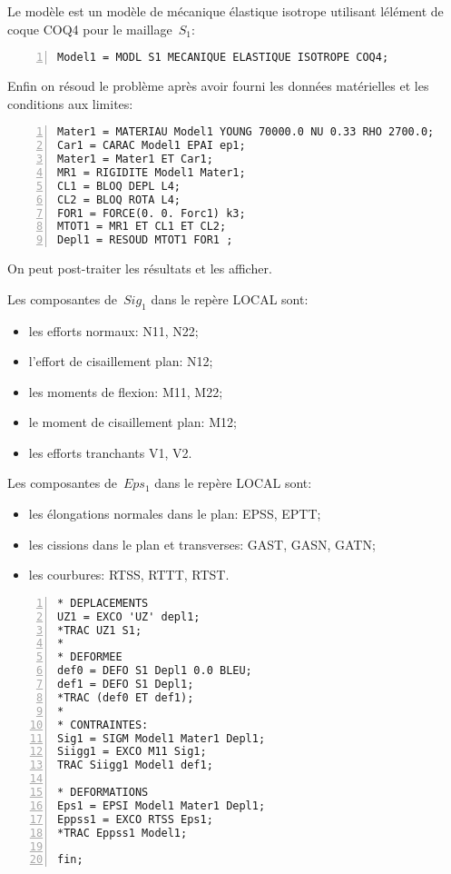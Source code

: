 \medskip
Le modèle est un modèle de mécanique élastique isotrope utilisant lélément de coque COQ4 pour le maillage~$S_1$:

\begin{Verbatim}[numbers=left,numbersep=3pt,firstnumber=last]
Model1 = MODL S1 MECANIQUE ELASTIQUE ISOTROPE COQ4;
\end{Verbatim}

\medskip
Enfin on résoud le problème après avoir fourni les données matérielles et les conditions aux limites:

\begin{Verbatim}[numbers=left,numbersep=3pt,firstnumber=last]
Mater1 = MATERIAU Model1 YOUNG 70000.0 NU 0.33 RHO 2700.0;
Car1 = CARAC Model1 EPAI ep1;
Mater1 = Mater1 ET Car1;
MR1 = RIGIDITE Model1 Mater1;
CL1 = BLOQ DEPL L4;
CL2 = BLOQ ROTA L4;
FOR1 = FORCE(0. 0. Forc1) k3;
MTOT1 = MR1 ET CL1 ET CL2;
Depl1 = RESOUD MTOT1 FOR1 ;
\end{Verbatim}

\medskip
On peut post-traiter les résultats et les afficher.

Les composantes de~$Sig_1$ dans le repère LOCAL sont:
\begin{itemize}
  \item les efforts normaux: N11, N22;
  \item l'effort de cisaillement plan: N12; 
  \item les moments de flexion: M11, M22;
  \item le moment de cisaillement plan: M12;
  \item les efforts tranchants V1, V2.
\end{itemize}

Les composantes de~$Eps_1$ dans le repère LOCAL sont:
\begin{itemize}
  \item les élongations normales dans le plan: EPSS, EPTT;
  \item les cissions dans le plan et transverses: GAST, GASN, GATN;
  \item les courbures: RTSS, RTTT, RTST.
\end{itemize}

\begin{Verbatim}[numbers=left,numbersep=3pt,firstnumber=last]
* DEPLACEMENTS
UZ1 = EXCO 'UZ' depl1;
*TRAC UZ1 S1;
*
* DEFORMEE
def0 = DEFO S1 Depl1 0.0 BLEU;
def1 = DEFO S1 Depl1;
*TRAC (def0 ET def1);
*
* CONTRAINTES: 
Sig1 = SIGM Model1 Mater1 Depl1;
Siigg1 = EXCO M11 Sig1;
TRAC Siigg1 Model1 def1;

* DEFORMATIONS
Eps1 = EPSI Model1 Mater1 Depl1;
Eppss1 = EXCO RTSS Eps1;
*TRAC Eppss1 Model1;

fin;
\end{Verbatim}


